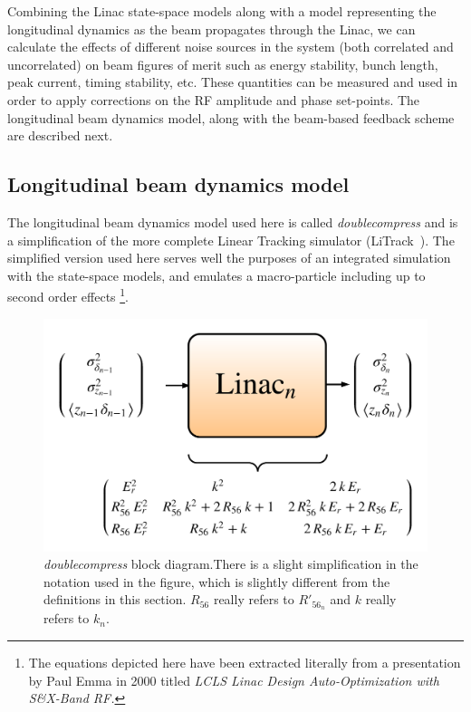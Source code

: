 \documentclass[a4paper,12pt]{article}
\begin{document}
Combining the Linac state-space models along with a model representing the longitudinal dynamics as the beam propagates through the Linac, we can calculate the effects of different noise sources in the system (both correlated and uncorrelated) on beam figures of merit such as energy stability, bunch length, peak current, timing stability, etc. These quantities can be measured and used in order to apply corrections on the RF amplitude and phase set-points. The longitudinal beam dynamics model, along with the beam-based feedback scheme are described next.

\subsection{Longitudinal beam dynamics model}
\label{sec:doublecompress}

The longitudinal beam dynamics model used here is called \emph{doublecompress} and is a simplification of the more complete Linear Tracking simulator (LiTrack~\cite{ref:litrack}). The simplified version used here serves well the purposes of an integrated simulation with the state-space models, and emulates a macro-particle including up to second order effects \footnote{The equations depicted here have been extracted literally from a presentation by Paul Emma in 2000 titled \emph{LCLS Linac Design Auto-Optimization with S\&X-Band RF.}}.

\begin{figure}
\centering
\includegraphics[scale=0.75]{../figures/doublecompress.png}
\caption{\emph{doublecompress} block diagram.There is a slight simplification in the notation used in the figure, which is slightly different from the definitions in this section. $R_{56}$ really refers to $R'_{56_n}$ and $k$ really refers to $k_n$.}
\label{fig:doublecompress}
\end{figure}
\end{document}
